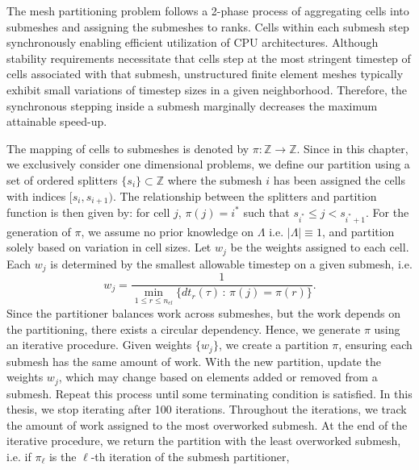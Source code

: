 The mesh partitioning problem follows a 2-phase process of aggregating cells into submeshes and assigning the submeshes to ranks. Cells within each submesh step synchronously enabling efficient utilization of CPU architectures. Although stability requirements necessitate that cells step at the most stringent timestep of cells associated with that submesh, unstructured finite element meshes typically exhibit small variations of timestep sizes in a given neighborhood. Therefore, the synchronous stepping inside a submesh marginally decreases the maximum attainable speed-up.

The mapping of cells to submeshes is denoted by $\pi:\mathbb{Z} \to \mathbb{Z}$.
Since in this chapter, we exclusively consider one dimensional problems, we define our partition using a set of ordered splitters $\{s_i\}\subset \mathbb{Z}$ where the submesh $i$ has been assigned the cells with indices $[s_i,s_{i+1})$. The relationship between the splitters and partition function is then given by: for cell $j$, $\pi(j) = i^*$ such that $s_{i^*} \le j < s_{i^*+1}$. %
For the generation of $\pi$, we assume no prior knowledge on $\Lambda$ i.e. $|\Lambda| \equiv 1$, and partition solely based on variation in cell sizes. 
Let $w_j$ be the weights assigned to each cell. Each $w_j$ is determined by the smallest allowable timestep on a given submesh, i.e.
\begin{equation*}
w_j = \frac{1}{\min_{1\le r \le n_{el}}\{dt_r(\tau) \, : \, \pi(j) = \pi(r) \}}.
\end{equation*}
Since the partitioner balances work across submeshes, but the work depends on the partitioning, there exists a circular dependency.
Hence, we generate $\pi$ using an iterative procedure. Given weights $\{w_j\}$, we create a partition $\pi$, ensuring each submesh has the same amount of work.
 With the new partition, update the weights $w_j$, which may change based on elements added or removed from a submesh. Repeat this process until some terminating condition is satisfied. In this thesis, we stop iterating after 100 iterations. Throughout the iterations, we track the amount of work assigned to the most overworked submesh. At the end of the iterative procedure, we return the partition with the least overworked submesh, i.e. if $\pi_{\ell}$ is the $\ell$-th iteration of the submesh partitioner, 
